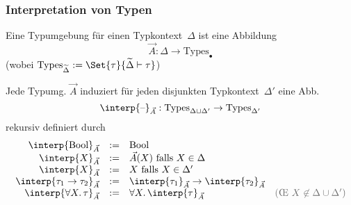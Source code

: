 \documentclass{beamer}
\newcommand{\defeq}{:=} %
\newcommand{\Bool}{\text{Bool}}
\newcommand{\fa}[1]{\forall {#1}.\,}
\newcommand{\Types}{\text{Types}}
\newcommand{\emptyCtx}{\bullet}
\newcommand{\blank}{\text{--}} %
\newcommand{\typeInterp}[2]{\interp{#2}_{#1}}
\renewcommand{\emph}[1]{\textcolor{Emph}{#1}}
\newcommand{\info}[1]{\textcolor{dimgray}{#1}}
\begin{document}
\begin{frame}
  \frametitle{Interpretation von Typen}

  Eine \emph{Typumgebung} für einen Typkontext~$\Delta$ ist eine Abbildung
  \[ \vec{A} : \Delta \to \Types_\emptyCtx \]
  (wobei $\Types_{\widetilde{\Delta}} \defeq \Set{\tau}{\widetilde{\Delta} \vdash \tau}$)

  Jede Typumg. $\vec{A}$ induziert für jeden disjunkten Typkontext~$\Delta'$ eine Abb.
  \[ \typeInterp{\vec{A}}{\blank} : \Types_{\Delta \sqcup \Delta'} \to \Types_{\Delta'} \]
  rekursiv definiert durch
  \[
    \begin{array}{r c l l}
      \typeInterp{\vec{A}}{\Bool} &\defeq& \Bool \\
      \typeInterp{\vec{A}}{X} &\defeq& \vec{A}(X) \text{ falls $X \in \Delta$} \\
      \typeInterp{\vec{A}}{X} &\defeq& X \text{ falls $X \in \Delta'$} \\
      \typeInterp{\vec{A}}{\tau_1 \to \tau_2} &\defeq& \typeInterp{\vec{A}}{\tau_1} \to \typeInterp{\vec{A}}{\tau_2} \\
      \typeInterp{\vec{A}}{\fa{X} \tau} &\defeq& \fa{X} \typeInterp{\vec{A}}{\tau} & \text{\info{(\OE{} $X \not\in \Delta \cup \Delta'$)}} \\
    \end{array}
  \]
\end{frame}
\end{document}
